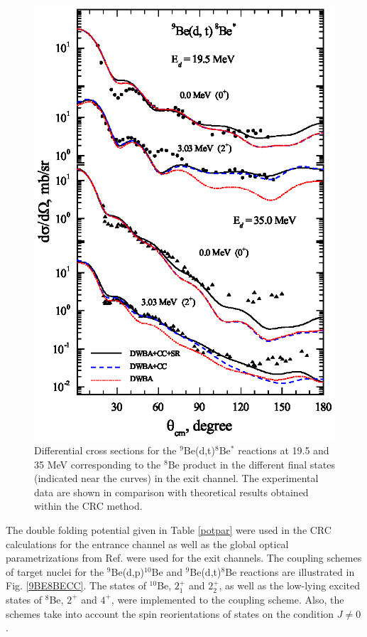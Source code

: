 \documentclass[10pt]{iopart}
\begin{document}
\begin{figure}[tp]
\includegraphics[scale=0.8]{3H8BE.eps}
\caption{
\label{3H8BE}
Differential cross sections for the ${}^9$Be(d,t)${}^{8}$Be$^*$ reactions at 19.5 and 35 MeV corresponding to the ${}^{8}$Be product in the different final states (indicated near the curves) in the exit channel. The experimental data are shown in comparison with  theoretical results obtained within the CRC method.}
\end{figure}

The double folding potential given in Table \ref{potpar} were used in the CRC calculations for the entrance channel as well as the global optical parametrizations from Ref. \cite{globalProton, globalTriton} were used for the exit channels. The coupling schemes of target nuclei for the ${}^9$Be(d,p)${}^{10}$Be and ${}^9$Be(d,t)${}^8$Be  reactions  are illustrated in Fig. \ref{9BE8BECC}. The states of ${}^{10}$Be, $2^+_{1}$ and $2^+_{2}$, as well as the low-lying excited states of ${}^8$Be, $2^+$ and $4^+$, were implemented to the coupling scheme. Also, the schemes take into account the spin reorientations of states on the condition $J \neq 0$.
\end{document}
